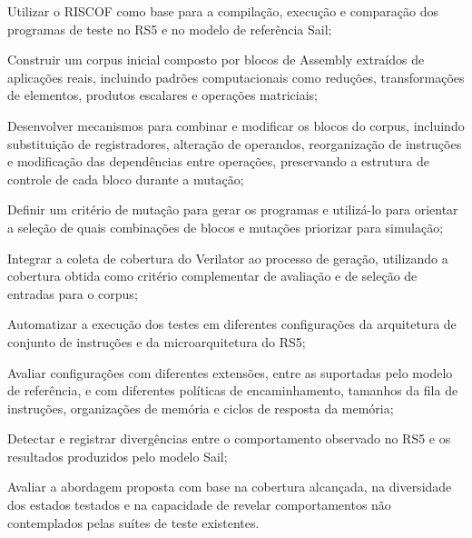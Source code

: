\begin{objetivos}
    \item \label{obj:1} Utilizar o RISCOF como base para a compilação, execução e comparação dos programas de teste no RS5 e no modelo de referência Sail;
 
    \item \label{obj:2} Construir um corpus inicial composto por blocos de Assembly extraídos de aplicações reais, incluindo padrões computacionais como reduções, transformações de elementos, produtos escalares e operações matriciais;
 
    \item \label{obj:3} Desenvolver mecanismos para combinar e modificar os blocos do corpus, incluindo substituição de registradores, alteração de operandos, reorganização de instruções e modificação das dependências entre operações, preservando a estrutura de controle de cada bloco durante a mutação;
 
    \item \label{obj:4} Definir um critério de mutação para gerar os programas e utilizá-lo para orientar a seleção de quais combinações de blocos e mutações priorizar para simulação;
 
    \item \label{obj:5} Integrar a coleta de cobertura do Verilator ao processo de geração, utilizando a cobertura obtida como critério complementar de avaliação e de seleção de entradas para o corpus;
 
    \item \label{obj:6} Automatizar a execução dos testes em diferentes configurações da arquitetura de conjunto de instruções e da microarquitetura do RS5;
 
    \item \label{obj:7} Avaliar configurações com diferentes extensões, entre as suportadas pelo modelo de referência, e com diferentes políticas de encaminhamento, tamanhos da fila de instruções, organizações de memória e ciclos de resposta da memória;
 
    \item \label{obj:8} Detectar e registrar divergências entre o comportamento observado no RS5 e os resultados produzidos pelo modelo Sail;
 
    \item \label{obj:9} Avaliar a abordagem proposta com base na cobertura alcançada, na diversidade dos estados testados e na capacidade de revelar comportamentos não contemplados pelas suítes de teste existentes.
\end{objetivos}
 
